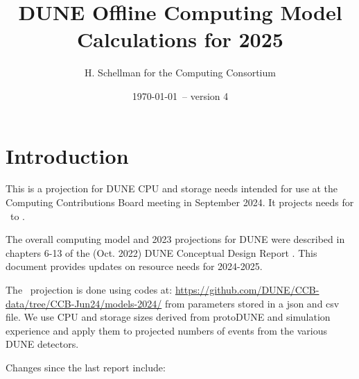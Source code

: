 \documentclass[12pt]{article}
\title{DUNE Offline Computing Model Calculations for 2025}
\author{H. Schellman for the Computing Consortium}
\date{\today\ -- version 4}
\newcommand{\csvautotabularright}[2][]{\csvloop{autotabularright={#2},#1}}
\begin{document}
\makeatletter

\maketitle

\tableofcontents
\newpage
\listoftables
\listoffigures

\section{Introduction}

This is a projection for DUNE CPU and storage needs intended for use at the Computing Contributions Board meeting in September 2024. It projects needs for \configRequestYear\ to \configMaxYear. 

The overall computing model  and 2023 projections for DUNE were described in chapters 6-13 of the  (Oct. 2022) DUNE Conceptual Design Report \cite{DUNE:2022fcw}.   This document provides updates on resource needs for 2024-2025. 

The \configRequestYear\ projection is done using codes at: \href{https://github.com/DUNE/CCB-data/tree/CCB-Jun24/models-2024/}{https://github.com/DUNE/CCB-data/tree/CCB-Jun24/models-2024/} from parameters stored in a json and csv file. We use CPU and storage sizes derived from protoDUNE and simulation experience and apply them to projected numbers of events from the various DUNE detectors. 







Changes since the last report \cite{CCB2024Report, CCB2024Minutes} include:
\end{document}
